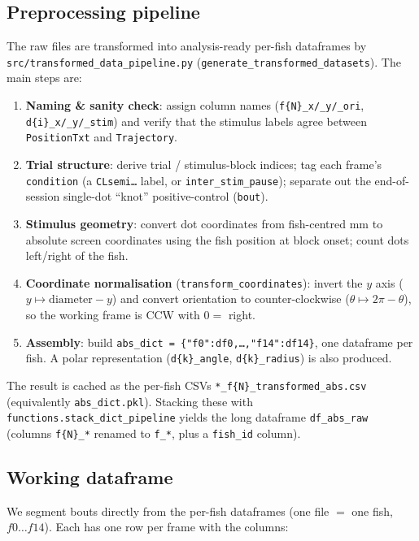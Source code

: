 \documentclass{article}
\begin{document}
\subsection{Preprocessing pipeline}
The raw files are transformed into analysis-ready per-fish dataframes by
\texttt{src/transformed\_data\_pipeline.py}
(\texttt{generate\_transformed\_datasets}). The main steps are:
\begin{enumerate}
  \item \textbf{Naming \& sanity check}: assign column names
        (\texttt{f\{N\}\_x/\_y/\_ori}, \texttt{d\{i\}\_x/\_y/\_stim}) and verify
        that the stimulus labels agree between \texttt{PositionTxt} and
        \texttt{Trajectory}.
  \item \textbf{Trial structure}: derive trial / stimulus-block indices; tag each
        frame's \texttt{condition} (a \texttt{CLsemi\dots} label, or
        \texttt{inter\_stim\_pause}); separate out the end-of-session
        single-dot ``knot'' positive-control (\texttt{bout}).
  \item \textbf{Stimulus geometry}: convert dot coordinates from
        fish-centred mm to absolute screen coordinates using the fish position
        at block onset; count dots left/right of the fish.
  \item \textbf{Coordinate normalisation} (\texttt{transform\_coordinates}):
        invert the $y$ axis ($y \mapsto \text{diameter}-y$) and convert
        orientation to counter-clockwise ($\theta \mapsto 2\pi-\theta$), so the
        working frame is CCW with $0 =$ right.
  \item \textbf{Assembly}: build \texttt{abs\_dict =
        \{"f0":df0,\dots,"f14":df14\}}, one dataframe per fish. A polar
        representation (\texttt{d\{k\}\_angle}, \texttt{d\{k\}\_radius}) is also
        produced.
\end{enumerate}
The result is cached as the per-fish CSVs
\texttt{*\_f\{N\}\_transformed\_abs.csv} (equivalently \texttt{abs\_dict.pkl}).
Stacking these with \texttt{functions.stack\_dict\_pipeline} yields the long
dataframe \texttt{df\_abs\_raw} (columns \texttt{f\{N\}\_*} renamed to
\texttt{f\_*}, plus a \texttt{fish\_id} column).

\subsection{Working dataframe}
We segment bouts directly from the per-fish dataframes (one file $=$ one fish,
$f0\dots f14$). Each has one row per frame with the columns:
\end{document}
